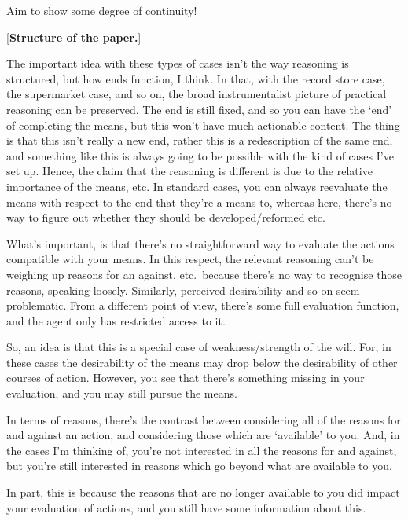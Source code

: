 \documentclass[10pt]{article}
\begin{document}
Aim to show some degree of continuity!


\begin{center}
  [\textbf{Structure of the paper.}]
\end{center}

\newpage

The important idea with these types of cases isn't the way reasoning is structured, but how ends function, I think.
In that, with the record store case, the supermarket case, and so on, the broad instrumentalist picture of practical reasoning can be preserved.
The end is still fixed, and so you can have the `end' of completing the means, but this won't have much actionable content.
The thing is that this isn't really a new end, rather this is a redescription of the same end, and something like this is always going to be possible with the kind of cases I've set up.
Hence, the claim that the reasoning is different is due to the relative importance of the means, etc.
In standard cases, you can always reevaluate the means with respect to the end that they're a means to, whereas here, there's no way to figure out whether they should be developed/reformed etc.

What's important, is that there's no straightforward way to evaluate the actions compatible with your means.
In this respect, the relevant reasoning can't be weighing up reasons for an against, etc.\ because there's no way to recognise those reasons, speaking loosely.
Similarly, perceived desirability and so on seem problematic.
From a different point of view, there's some full evaluation function, and the agent only has restricted access to it.

So, an idea is that this is a special case of weakness/strength of the will.
For, in these cases the desirability of the means may drop below the desirability of other courses of action.
However, you see that there's something missing in your evaluation, and you may still pursue the means.

In terms of reasons, there's the contrast between considering all of the reasons for and against an action, and considering those which are `available' to you.
And, in the cases I'm thinking of, you're not interested in all the reasons for and against, but you're still interested in reasons which go beyond what are available to you.

In part, this is because the reasons that are no longer available to you did impact your evaluation of actions, and you still have some information about this.
\end{document}
